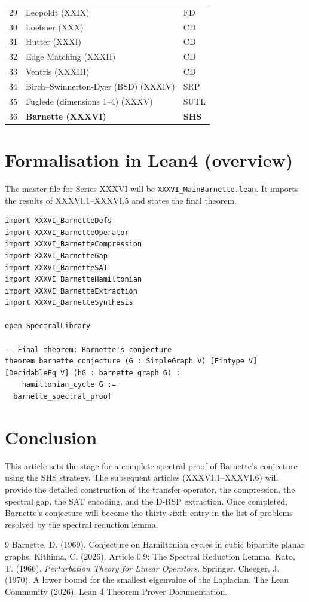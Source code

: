 \documentclass[11pt,a4paper]{article}
\begin{document}
\begin{center}
\begin{longtable}{@{}cll@{}}
29 & Leopoldt (XXIX) & FD \\
30 & Loebner (XXX) & CD \\
31 & Hutter (XXXI) & CD \\
32 & Edge Matching (XXXII) & CD \\
33 & Ventris (XXXIII) & CD \\
34 & Birch–Swinnerton-Dyer (BSD) (XXXIV) & SRP \\
35 & Fuglede (dimensions 1–4) (XXXV) & SUTL \\
36 & \textbf{Barnette (XXXVI)} & \textbf{SHS} \\
\bottomrule
\end{longtable}
\normalsize
\end{center}

\section{Formalisation in Lean4 (overview)}

The master file for Series XXXVI will be \texttt{XXXVI\_MainBarnette.lean}. It imports the results of XXXVI.1–XXXVI.5 and states the final theorem.

\begin{lstlisting}[style=lean, caption={XXXVI_MainBarnette.lean (sketch)}]
import XXXVI_BarnetteDefs
import XXXVI_BarnetteOperator
import XXXVI_BarnetteCompression
import XXXVI_BarnetteGap
import XXXVI_BarnetteSAT
import XXXVI_BarnetteHamiltonian
import XXXVI_BarnetteExtraction
import XXXVI_BarnetteSynthesis

open SpectralLibrary

-- Final theorem: Barnette's conjecture
theorem barnette_conjecture (G : SimpleGraph V) [Fintype V] [DecidableEq V] (hG : barnette_graph G) :
    hamiltonian_cycle G :=
  barnette_spectral_proof
\end{lstlisting}

\section{Conclusion}

This article sets the stage for a complete spectral proof of Barnette's conjecture using the SHS strategy. The subsequent articles (XXXVI.1–XXXVI.6) will provide the detailed construction of the transfer operator, the compression, the spectral gap, the SAT encoding, and the D‑RSP extraction. Once completed, Barnette's conjecture will become the thirty‑sixth entry in the list of problems resolved by the spectral reduction lemma.


\begin{thebibliography}{9}
  Barnette, D. (1969). Conjecture on Hamiltonian cycles in cubic bipartite planar graphs.
  Kithima, C. (2026). Article 0.9: The Spectral Reduction Lemma.
  Kato, T. (1966). \emph{Perturbation Theory for Linear Operators}. Springer.
  Cheeger, J. (1970). A lower bound for the smallest eigenvalue of the Laplacian.
  The Lean Community (2026). Lean 4 Theorem Prover Documentation.
\end{thebibliography}
\end{document}
